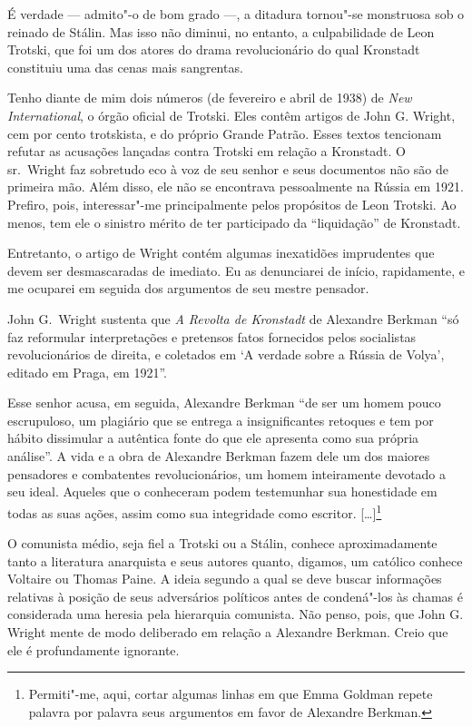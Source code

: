 É verdade --- admito"-o de bom grado ---, a ditadura tornou"-se monstruosa
sob o reinado de Stálin. Mas isso não diminui, no entanto, a
culpabilidade de Leon Trotski, que foi um dos atores do drama
revolucionário do qual Kronstadt constituiu uma das cenas mais
sangrentas.
\asterisc

Tenho diante de mim dois números (de fevereiro e abril de 1938) de \textit{New
International}, o órgão oficial de Trotski. Eles contêm artigos de John
G. Wright, cem por cento trotskista, e do próprio Grande Patrão.
Esses textos tencionam refutar as acusações lançadas contra Trotski em
relação a Kronstadt. O sr.~Wright faz sobretudo eco à voz de seu senhor
e seus documentos não são de primeira mão. Além disso, ele não se
encontrava pessoalmente na Rússia em 1921. Prefiro, pois,
interessar"-me principalmente pelos propósitos de Leon Trotski.
Ao menos, tem ele o sinistro mérito de ter participado da “liquidação”
de Kronstadt.

Entretanto, o artigo de Wright contém algumas inexatidões imprudentes
que devem ser desmascaradas de imediato. Eu as denunciarei de início,
rapidamente, e me ocuparei em seguida dos argumentos de seu mestre
pensador.

John G.~Wright sustenta que \textit{A Revolta de Kronstadt} de Alexandre Berkman
“só faz reformular interpretações e pretensos fatos fornecidos pelos
socialistas revolucionários de direita, e coletados em ‘A verdade sobre
a Rússia de Volya’, editado em Praga, em 1921”.

Esse senhor acusa, em seguida, Alexandre Berkman “de ser um homem pouco
escrupuloso, um plagiário que se entrega a insignificantes retoques e
tem por hábito dissimular a autêntica fonte do que ele apresenta como
sua própria análise”. A vida e a obra de Alexandre Berkman fazem dele
um dos maiores pensadores e combatentes revolucionários, um homem
inteiramente devotado a seu ideal. Aqueles que o conheceram podem
testemunhar sua honestidade em todas as suas ações, assim como sua
integridade como escritor. [\ldots]\footnote{ Permiti"-me, aqui, cortar algumas 
linhas em que Emma Goldman repete palavra por palavra seus argumentos 
em favor de Alexandre Berkman.}

O comunista médio, seja fiel a Trotski ou a Stálin, conhece
aproximadamente tanto a literatura anarquista e seus autores quanto,
digamos, um católico conhece Voltaire ou Thomas Paine. A ideia segundo
a qual se deve buscar informações relativas à posição de seus
adversários políticos antes de condená"-los às chamas é considerada 
uma heresia pela hierarquia comunista. Não penso, pois, que John G.
Wright mente de modo deliberado em relação a Alexandre Berkman. Creio
que ele é profundamente ignorante.

